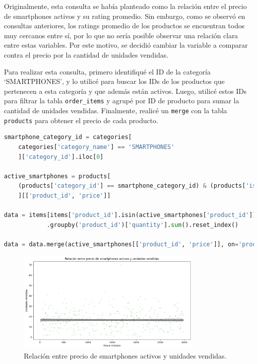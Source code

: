 Originalmente, esta consulta se había planteado como la relación entre el precio de smartphones activos y su rating promedio. Sin embargo, como se observó en consultas anteriores, los ratings promedio de los productos se encuentran todos muy cercanos entre sí, por lo que no sería posible observar una relación clara entre estas variables. Por este motivo, se decidió cambiar la variable a comparar contra el precio por la cantidad de unidades vendidas.

Para realizar esta consulta, primero identifiqué el ID de la categoría `SMARTPHONES', y lo utilicé para buscar los IDs de los productos que pertenecen a esta categoría y que además están activos. Luego, utilicé estos IDs para filtrar la tabla \texttt{order\_items} y agrupé por ID de producto para sumar la cantidad de unidades vendidas. Finalmente, realicé un \texttt{merge} con la tabla \texttt{products} para obtener el precio de cada producto.

\begin{lstlisting}[language=Python, xleftmargin=40pt, xrightmargin=40pt]
smartphone_category_id = categories[
    categories['category_name'] == 'SMARTPHONES'
    ]['category_id'].iloc[0]

active_smartphones = products[
    (products['category_id'] == smartphone_category_id) & (products['is_active'])
    ][['product_id', 'price']]

data = items[items['product_id'].isin(active_smartphones['product_id'])]
            .groupby('product_id')['quantity'].sum().reset_index()

data = data.merge(active_smartphones[['product_id', 'price']], on='product_id', how='left')
\end{lstlisting}

\begin{figure}[H]
    \centering
    \includegraphics[width=0.8\textwidth]{imagenes/consultas_propias/smartphones.png}
    \caption{Relación entre precio de smartphones activos y unidades vendidas.}
    \label{fig:smartphone_price_vs_quantity}
\end{figure}

